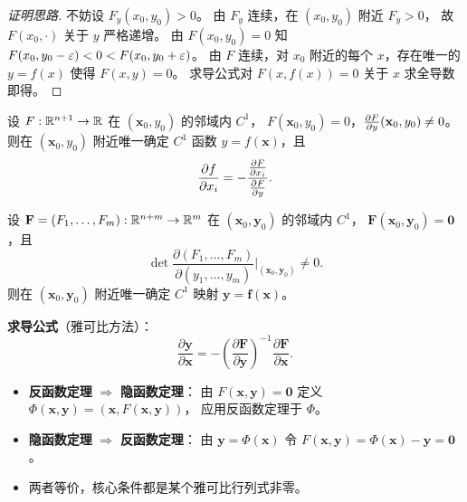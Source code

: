 \documentclass{ctexart}
\begin{document}
\begin{proof}[证明思路]
  不妨设 $F_y(x_0, y_0) > 0$。
  由 $F_y$ 连续，在 $(x_0, y_0)$ 附近 $F_y > 0$，
  故 $F(x_0, \cdot)$ 关于 $y$ 严格递增。
  由 $F(x_0, y_0) = 0$ 知 $F(x_0, y_0-\varepsilon) < 0 < F(x_0, y_0+\varepsilon)$。
  由 $F$ 连续，对 $x_0$ 附近的每个 $x$，存在唯一的 $y = f(x)$ 使得 $F(x,y) = 0$。
  求导公式对 $F(x, f(x)) = 0$ 关于 $x$ 求全导数即得。
\end{proof}

\begin{theorem}
  设 $F: \mathbb{R}^{n+1} \to \mathbb{R}$ 在 $(\mathbf{x}_0, y_0)$ 的邻域内 $C^1$，
  $F(\mathbf{x}_0, y_0) = 0$，$\frac{\partial F}{\partial y}(\mathbf{x}_0, y_0) \ne 0$。
  则在 $(\mathbf{x}_0, y_0)$ 附近唯一确定 $C^1$ 函数 $y = f(\mathbf{x})$，且
  \[
    \frac{\partial f}{\partial x_i} = -\frac{\frac{\partial F}{\partial x_i}}{\frac{\partial F}{\partial y}}.
  \]
\end{theorem}

\begin{theorem}[隐函数组定理]
  \label{thm:implicit-sys}
  设 $\mathbf{F} = (F_1, \ldots, F_m): \mathbb{R}^{n+m} \to \mathbb{R}^m$ 在
  $(\mathbf{x}_0, \mathbf{y}_0)$ 的邻域内 $C^1$，
  $\mathbf{F}(\mathbf{x}_0, \mathbf{y}_0) = \mathbf{0}$，且
  \[
    \det\frac{\partial(F_1, \ldots, F_m)}{\partial(y_1, \ldots, y_m)}
    \bigg|_{(\mathbf{x}_0, \mathbf{y}_0)} \ne 0.
  \]
  则在 $(\mathbf{x}_0, \mathbf{y}_0)$ 附近唯一确定 $C^1$ 映射
  $\mathbf{y} = \mathbf{f}(\mathbf{x})$。

  \textbf{求导公式}（雅可比方法）：
  \[
    \frac{\partial \mathbf{y}}{\partial \mathbf{x}}
    = -\left( \frac{\partial \mathbf{F}}{\partial \mathbf{y}} \right)^{-1}
      \frac{\partial \mathbf{F}}{\partial \mathbf{x}}.
  \]
\end{theorem}

\begin{remark}[隐函数定理与反函数定理的关系]
  \begin{itemize}
    \item \textbf{反函数定理} $\Rightarrow$ \textbf{隐函数定理}：
      由 $F(\mathbf{x}, \mathbf{y}) = \mathbf{0}$ 定义
      $\Phi(\mathbf{x}, \mathbf{y}) = (\mathbf{x}, F(\mathbf{x}, \mathbf{y}))$，
      应用反函数定理于 $\Phi$。
    \item \textbf{隐函数定理} $\Rightarrow$ \textbf{反函数定理}：
      由 $\mathbf{y} = \Phi(\mathbf{x})$ 令
      $F(\mathbf{x}, \mathbf{y}) = \Phi(\mathbf{x}) - \mathbf{y} = \mathbf{0}$。
    \item 两者等价，核心条件都是某个雅可比行列式非零。
  \end{itemize}
\end{remark}
\end{document}
